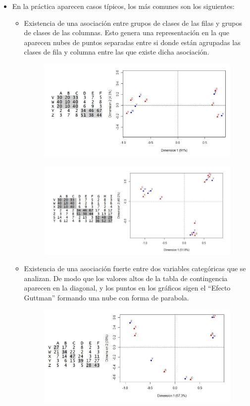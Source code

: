 \begin{itemize}
    \item En la práctica aparecen casos típicos, los más comunes son los siguientes:
    \begin{itemize}
        \item Existencia de una asociación entre grupos de clases de las filas y grupos de clases de las columnas. Esto genera una representación en la que aparecen nubes de puntos separadas entre si donde están agrupadas las clases de fila y columna entre las que existe dicha asociación.
        \begin{figure}[ht]
            \includegraphics[width=\textwidth]{assets/asociacion_gruopos1.png}
        \end{figure}
        \begin{figure}[ht]
            \includegraphics[width=\textwidth]{assets/asociacion_gruopos2.png}
        \end{figure}
        \newpage
        \item Existencia de una asociación fuerte entre dos variables categóricas que se analizan. De modo que los valores altos de la tabla de contingencia aparecen en la diagonal, y los puntos en los gráficos sigen el ``Efecto Guttman'' formando una nube con forma de parabola.
        \begin{figure}[ht]
            \includegraphics[width=\textwidth]{assets/asociacion_guttman.png}

\end{figure}
\end{itemize}
\end{itemize}
